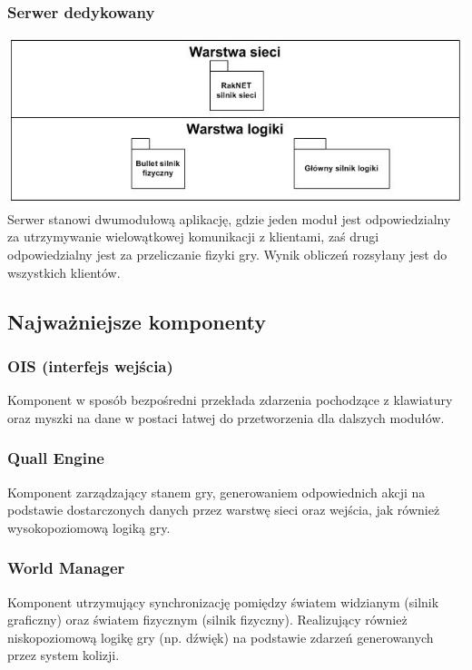 \documentclass[12pt,a4paper,twoside]{article}
\begin{document}
\subsubsection{Serwer dedykowany}
\includegraphics{pics/LogicalViewServer.jpg}
Serwer stanowi dwumodułową aplikację, gdzie jeden moduł jest odpowiedzialny za utrzymywanie wielowątkowej komunikacji z klientami, zaś drugi odpowiedzialny jest za przeliczanie fizyki gry. Wynik obliczeń rozsyłany jest do wszystkich klientów.

\subsection{Najważniejsze komponenty}



\subsubsection{OIS (interfejs wejścia)}
Komponent w sposób bezpośredni przekłada zdarzenia pochodzące z klawiatury oraz myszki na dane w postaci łatwej do przetworzenia dla dalszych modułów.
\subsubsection{Quall Engine}
Komponent zarządzający stanem gry, generowaniem odpowiednich akcji na podstawie dostarczonych danych przez warstwę sieci oraz wejścia, jak również wysokopoziomową logiką gry.
\subsubsection{World Manager}
Komponent utrzymujący synchronizację pomiędzy światem widzianym (silnik graficzny) oraz światem fizycznym (silnik fizyczny). Realizujący również niskopoziomową logikę gry (np. dźwięk) na podstawie zdarzeń generowanych przez system kolizji.
\end{document}
